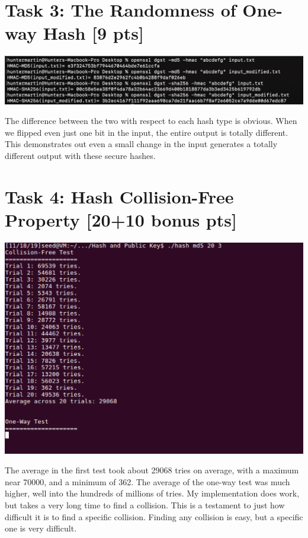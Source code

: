 \documentclass{article}
\begin{document}
\section{Task 3: The Randomness of One-way Hash [9 pts]}
\begin{center}
    \includegraphics[scale=0.6]{task3.png}
\end{center}

The difference between the two  with respect to each hash type is obvious.  When we flipped even just one bit in the input, the entire output is totally different.  This demonstrates out even a small change in the input generates a totally different output with these secure hashes.

\section{Task 4: Hash Collision-Free Property [20+10 bonus pts]}
\begin{center}
    \includegraphics[scale=0.5]{task4.png}
\end{center}

The average in the first test took about 29068 tries on average, with a maximum near 70000, and a minimum of 362.  The average of the one-way test was much higher, well into the hundreds of millions of tries.  My implementation does work, but takes a very long time to find a collision.  This is a testament to just how difficult it is to find a specific collision.  Finding any collision is easy, but a specific one is very difficult.
\end{document}
